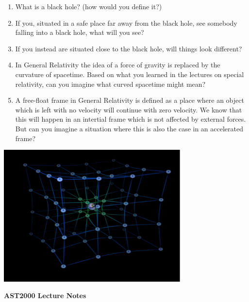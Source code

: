 {\large
\begin{enumerate}
\item What is a black hole? (how would you define it?)
\item If you, situated in a safe place far away from the black hole, see somebody falling into a black hole, what will you see?
\item If you instead are situated close to the black hole, will things look different?
\item In General Relativity the idea of a force of gravity is replaced by the curvature of spacetime. Based on what you learned in the lectures on special relativity, can you imagine what curved spacetime might mean?
\item A free-float frame in General Relativity is defined as a place where an object which is left with no velocity will continue with zero velocity. We know that this will happen in an intertial frame which is not affected by external forces. But can you imagine a situation where this is also the case in an accelerated frame?
\end{enumerate}

\begin{Figure}%
\centering
\includegraphics[width=0.72\textwidth]{spacetimebending.pdf}
\end{Figure}


\clearpage
\vspace*{2cm}

{\centerline{\bf\huge AST2000 Lecture Notes}}

\vspace*{1cm}

}
